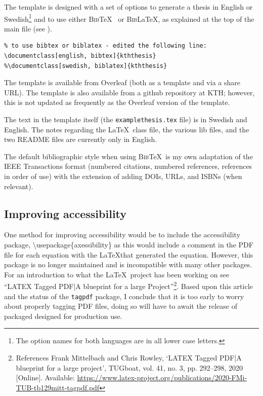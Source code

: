 The template is designed with a set of options to generate a thesis in English or Swedish\footnote{The option names for both languages are in all lower case letters.} and to use either \textsc{Bib}\TeX~ or \textsc{Bib}\LaTeX, as explained at the top of the main file (see ).
\begin{lstlisting}[language={[LaTeX]TeX}, caption={\textbackslash documentclass}, label=lst:document]
%% set the default language to english or swedish by passing an option to the documentclass - this handles the inside tile page
% to use bibtex or biblatex - edited the following line:
\documentclass[english, bibtex]{kththesis}
%\documentclass[swedish, biblatex]{kththesis}
\end{lstlisting}

The template is available from Overleaf (both as a template and via a share URL). The template is also available from a github repository at KTH; however, this is not updated as frequently as the Overleaf version of the template.

The text in the template itself (\ie the \texttt{examplethesis.tex} file) is in Swedish and English. The notes regarding the \LaTeX~class file, the various lib files, and the two README files are currently only in English.

The default bibliographic style when using \textsc{Bib}\TeX~is my own adaptation of the IEEE Transactions format (\ie numbered citations, numbered references, references in order of use) with the extension of adding DOIs, URLs, and ISBNs (when relevant).

\subsection{Improving accessibility}
\label{sec:improvingAccessibility}
One method for improving accessibility would be to include the accessibility package, \ie \textbackslash usepackage\{axessibility\} as this would include a comment in the PDF file for each equation with the \LaTeX that generated the equation. However, this package is no longer maintained and is incompatible with many other packages. For an introduction to what the \LaTeX~project has been working on see “LATEX Tagged PDF|A blueprint for a large Project”\footnote{References
Frank Mittelbach and Chris Rowley, ‘LATEX Tagged PDF|A blueprint for a large project’, TUGboat, vol. 41, no. 3, pp. 292–298, 2020 [Online]. Available: \url{https://www.latex-project.org/publications/2020-FMi-TUB-tb129mitt-tagpdf.pdf}}. Based upon this article and the status of the \texttt{tagpdf} package, I conclude that it is too early to worry about properly tagging PDF files, doing so will have to await the release of packaged designed for production use.

